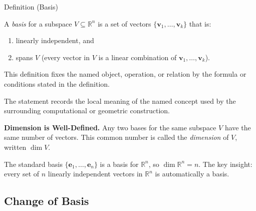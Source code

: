 \begin{definitionbox}{Definition (Basis)}
\begin{definition}[Basis]
\label{def:subspace-basis}
A \emph{basis} for a subspace $V \subseteq \mathbb{R}^n$ is a set of vectors
$\{\mathbf{v}_1, \ldots, \mathbf{v}_k\}$ that is:
\begin{enumerate}
  \item linearly independent, and
  \item spans $V$ (every vector in $V$ is a linear combination of $\mathbf{v}_1,\ldots,\mathbf{v}_k$).
\end{enumerate}
\end{definition}
\end{definitionbox}
\begin{remark*}
This definition fixes the named object, operation, or relation by the formula
or conditions stated in the definition.
\end{remark*}

\begin{remark*}[Interpretation]
The statement records the local meaning of the named concept used by the
surrounding computational or geometric construction.
\end{remark*}

\DefinitionalRoot

\begin{remark*}[Exposition]
\textbf{Dimension is Well-Defined.}
Any two bases for the same subspace $V$ have the same number of vectors.
This common number is called the \emph{dimension} of $V$, written $\dim V$.
\end{remark*}

\begin{remark*}[Exposition]
The standard basis $\{\mathbf{e}_1, \ldots, \mathbf{e}_n\}$ is a basis for $\mathbb{R}^n$,
so $\dim \mathbb{R}^n = n$.
The key insight: every set of $n$ linearly independent vectors in $\mathbb{R}^n$ is
automatically a basis.
\end{remark*}

\subsection*{Change of Basis}

